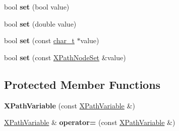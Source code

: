 \begin{DoxyCompactItemize}
\item 
\hypertarget{classphys_1_1xml_1_1XPathVariable_a870bcf372fc1aeef94376fa54ec95f5a}{
bool {\bfseries set} (bool value)}
\label{df/dee/classphys_1_1xml_1_1XPathVariable_a870bcf372fc1aeef94376fa54ec95f5a}

\item 
\hypertarget{classphys_1_1xml_1_1XPathVariable_a24cbfb111cde61e76cb187e8aceb7b67}{
bool {\bfseries set} (double value)}
\label{df/dee/classphys_1_1xml_1_1XPathVariable_a24cbfb111cde61e76cb187e8aceb7b67}

\item 
\hypertarget{classphys_1_1xml_1_1XPathVariable_a2c3d27c159c0b18749d5aff00b06b2b3}{
bool {\bfseries set} (const \hyperlink{namespacephys_1_1xml_afc87705cd1c2917d87b879715a2d8f6e}{char\_\-t} $\ast$value)}
\label{df/dee/classphys_1_1xml_1_1XPathVariable_a2c3d27c159c0b18749d5aff00b06b2b3}

\item 
\hypertarget{classphys_1_1xml_1_1XPathVariable_ab0ee0ad06a3914eaf1243000bfc7b699}{
bool {\bfseries set} (const \hyperlink{classphys_1_1xml_1_1XPathNodeSet}{XPathNodeSet} \&value)}
\label{df/dee/classphys_1_1xml_1_1XPathVariable_ab0ee0ad06a3914eaf1243000bfc7b699}

\end{DoxyCompactItemize}
\subsection*{Protected Member Functions}
\begin{DoxyCompactItemize}
\item 
\hypertarget{classphys_1_1xml_1_1XPathVariable_a37a47c3f05c4509f83193c1fa1c355e5}{
{\bfseries XPathVariable} (const \hyperlink{classphys_1_1xml_1_1XPathVariable}{XPathVariable} \&)}
\label{df/dee/classphys_1_1xml_1_1XPathVariable_a37a47c3f05c4509f83193c1fa1c355e5}

\item 
\hypertarget{classphys_1_1xml_1_1XPathVariable_a2cd8ec528ae06c55219ac32d0af78eee}{
\hyperlink{classphys_1_1xml_1_1XPathVariable}{XPathVariable} \& {\bfseries operator=} (const \hyperlink{classphys_1_1xml_1_1XPathVariable}{XPathVariable} \&)}
\label{df/dee/classphys_1_1xml_1_1XPathVariable_a2cd8ec528ae06c55219ac32d0af78eee}

\end{DoxyCompactItemize}
